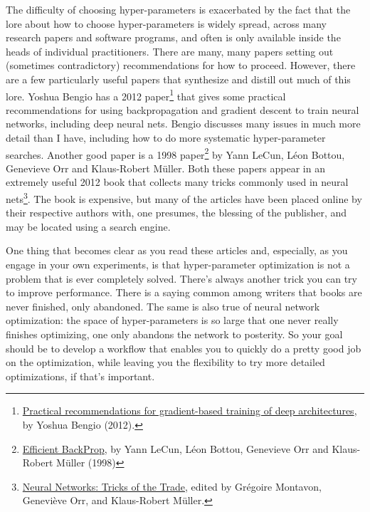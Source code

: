 \documentclass[a4paper,twoside,10pt]{book}
\begin{document}
The difficulty of choosing hyper-parameters is exacerbated by the fact that the lore about how to choose hyper-parameters is widely spread, across many research papers and software programs, and often is only available inside the heads of individual practitioners. There are many, many papers setting out (sometimes contradictory) recommendations for how to proceed. However, there are a few particularly useful papers that synthesize and distill out much of this lore. Yoshua Bengio has a 2012 paper\footnote{\href{http://arxiv.org/abs/1206.5533}{Practical recommendations for gradient-based training of deep architectures}, by Yoshua Bengio (2012).} that gives some practical recommendations for using backpropagation and gradient descent to train neural networks, including deep neural nets. Bengio discusses many issues in much more detail than I have, including how to do more systematic hyper-parameter searches. Another good paper is a 1998 paper\footnote{\href{http://yann.lecun.com/exdb/publis/pdf/lecun-98b.pdf}{Efficient BackProp}, by Yann LeCun, Léon Bottou, Genevieve Orr and Klaus-Robert M\"{u}ller (1998)} by Yann LeCun, L\'{e}on Bottou, Genevieve Orr and Klaus-Robert M\"{u}ller. Both these papers appear in an extremely useful 2012 book that collects many tricks commonly used in neural nets\footnote{\href{http://www.springer.com/computer/theoretical+computer+science/book/978-3-642-35288-1}{Neural Networks: Tricks of the Trade}, edited by Gr\'egoire Montavon, Genevi\`eve Orr, and Klaus-Robert M\"{u}ller.}. The book is expensive, but many of the articles have been placed online by their respective authors with, one presumes, the blessing of the publisher, and may be located using a search engine.

One thing that becomes clear as you read these articles and, especially, as you engage in your own experiments, is that hyper-parameter optimization is not a problem that is ever completely solved. There's always another trick you can try to improve performance. There is a saying common among writers that books are never finished, only abandoned. The same is also true of neural network optimization: the space of hyper-parameters is so large that one never really finishes optimizing, one only abandons the network to posterity. So your goal should be to develop a workflow that enables you to quickly do a pretty good job on the optimization, while leaving you the flexibility to try more detailed optimizations, if that's important.
\end{document}
